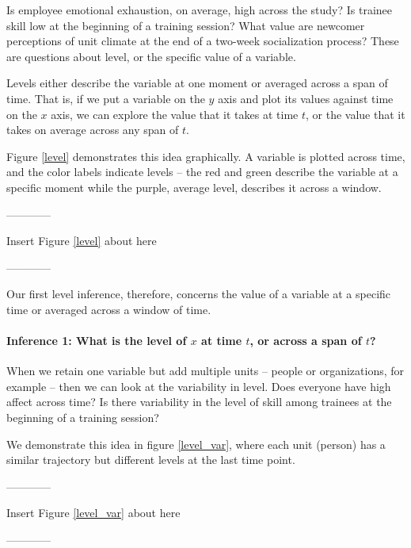 \documentclass[english,,man]{apa6}
\let\oldparagraph\paragraph
\renewcommand{\paragraph}[1]{\oldparagraph{#1}\mbox{}}
\theoremstyle{definition}
\theoremstyle{definition}
\theoremstyle{definition}
\theoremstyle{remark}
\begin{document}
Is employee emotional exhaustion, on average, high across the study? Is
trainee skill low at the beginning of a training session? What value are
newcomer perceptions of unit climate at the end of a two-week
socialization process? These are questions about level, or the specific
value of a variable.

Levels either describe the variable at one moment or averaged across a
span of time. That is, if we put a variable on the \(y\) axis and plot
its values against time on the \(x\) axis, we can explore the value that
it takes at time \(t\), or the value that it takes on average across any
span of \(t\).

Figure \ref{level} demonstrates this idea graphically. A variable is
plotted across time, and the color labels indicate levels -- the red and
green describe the variable at a specific moment while the purple,
average level, describes it across a window.

\begin{center}

------------

Insert Figure \ref{level} about here

------------

\end{center}

\noindent Our first level inference, therefore, concerns the value of a
variable at a specific time or averaged across a window of time.

\hypertarget{inference-1-what-is-the-level-of-x-at-time-t-or-across-a-span-of-t}{%
\paragraph{\texorpdfstring{Inference 1: What is the level of \(x\) at
time \(t\), or across a span of
\(t\)?}{Inference 1: What is the level of x at time t, or across a span of t?}}\label{inference-1-what-is-the-level-of-x-at-time-t-or-across-a-span-of-t}}

When we retain one variable but add multiple units -- people or
organizations, for example -- then we can look at the variability in
level. Does everyone have high affect across time? Is there variability
in the level of skill among trainees at the beginning of a training
session?

We demonstrate this idea in figure \ref{level_var}, where each unit
(person) has a similar trajectory but different levels at the last time
point.

\begin{center}

------------

Insert Figure \ref{level_var} about here

------------

\end{center}
\end{document}
